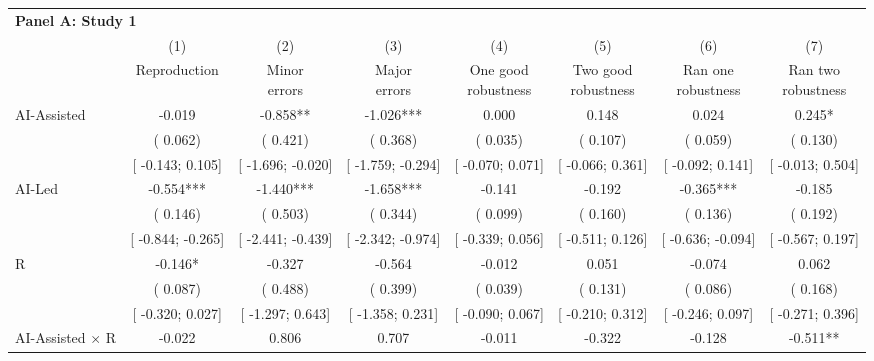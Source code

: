 \def\sym#1{\ifmmode^{#1}\else\(^{#1}\)\fi}
\begin{tabular}{l*{7}{c}}
\hline\hline
\multicolumn{8}{l}{\textbf{Panel A: Study 1}}\\
& (1) & (2) & (3) & (4) & (5) & (6) & (7)\\
                    &Reproduction   &\shortstack[c]{Minor\\errors}   &\shortstack[c]{Major\\errors}   &\shortstack[c]{One good\\robustness}   &\shortstack[c]{Two good\\robustness}   &\shortstack[c]{Ran one\\robustness}   &\shortstack[c]{Ran two\\robustness}   \\
\hline
AI-Assisted         &   -0.019   &   -0.858**   &   -1.026***   &    0.000   &    0.148   &    0.024   &    0.245*   \\
                    &(    0.062)   &(    0.421)   &(    0.368)   &(    0.035)   &(    0.107)   &(    0.059)   &(    0.130)   \\
                    &[   -0.143;     0.105]   &[   -1.696;    -0.020]   &[   -1.759;    -0.294]   &[   -0.070;     0.071]   &[   -0.066;     0.361]   &[   -0.092;     0.141]   &[   -0.013;     0.504]   \\
AI-Led         &   -0.554***   &   -1.440***   &   -1.658***   &   -0.141   &   -0.192   &   -0.365***   &   -0.185   \\
                    &(    0.146)   &(    0.503)   &(    0.344)   &(    0.099)   &(    0.160)   &(    0.136)   &(    0.192)   \\
                    &[   -0.844;    -0.265]   &[   -2.441;    -0.439]   &[   -2.342;    -0.974]   &[   -0.339;     0.056]   &[   -0.511;     0.126]   &[   -0.636;    -0.094]   &[   -0.567;     0.197]   \\
R         &   -0.146*   &   -0.327   &   -0.564   &   -0.012   &    0.051   &   -0.074   &    0.062   \\
                    &(    0.087)   &(    0.488)   &(    0.399)   &(    0.039)   &(    0.131)   &(    0.086)   &(    0.168)   \\
                    &[   -0.320;     0.027]   &[   -1.297;     0.643]   &[   -1.358;     0.231]   &[   -0.090;     0.067]   &[   -0.210;     0.312]   &[   -0.246;     0.097]   &[   -0.271;     0.396]   \\
AI-Assisted $\times$ R         &   -0.022   &    0.806   &    0.707   &   -0.011   &   -0.322   &   -0.128   &   -0.511**   \\

\end{tabular}
